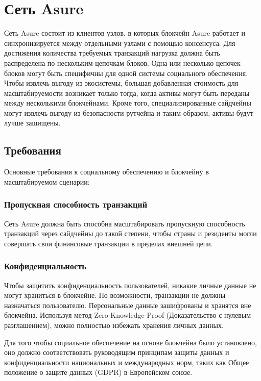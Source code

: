 \section{Сеть Asure}

Сеть Asure состоит из клиентов узлов, в которых блокчейн Asure работает и синхронизируется между отдельными узлами с помощью консенсуса. Для достижения количества требуемых транзакций нагрузка должна быть распределена по нескольким цепочкам блоков. Одна или несколько цепочек блоков могут быть специфичны для одной системы социального обеспечения.  Чтобы извлечь выгоду из экосистемы, большая добавленная стоимость для масштабируемости возникает только тогда, когда активы могут быть переданы между несколькими блокчейнами. Кроме того, специализированные сайдчейны могут извлечь выгоду из безопасности рутчейна и таким образом, активы будут лучше защищены. \cite{omisego}

\subsection{Требования}
Основные требования к социальному обеспечению и блокчейну в масштабируемом сценарии:

\subsubsection*{Пропускная способность транзакций}
Сеть Asure должна быть способна масштабировать пропускную способность транзакций через сайдчейны до такой степени, чтобы страны и резиденты могли совершать свои финансовые транзакции в пределах внешней цепи.

\subsubsection*{Конфиденциальность}
Чтобы защитить конфиденциальность пользователей, никакие личные данные не могут храниться в блокчейне. По возможности, транзакции не должны назначаться пользователю. Персональные данные зашифрованы и хранятся вне блокчейна. Используя метод Zero-Knowledge-Proof (Доказательство с нулевым разглашением), можно полностью избежать хранения личных данных. 

Для того чтобы социальное обеспечение на основе блокчейна было установлено, оно должно соответствовать руководящим принципам защиты данных и конфиденциальности национальных и международных норм, таких как Общее положение о защите данных (GDPR) в Европейском союзе. \cite{gdpr}


